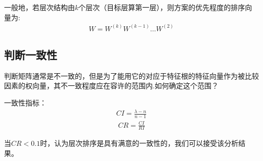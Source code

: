 \documentclass[letterpaper,10pt,english]{sphinxmanual}
\begin{document}
一般地，若层次结构由\(k\)个层次（目标层算第一层），则方案的优先程度的排序向量为:
\begin{equation*}
\begin{split}
W=W^{(k)} W^{(k-1)} \dots W^{(2)}
\end{split}
\end{equation*}

\subsection{判断一致性}
\label{\detokenize{docs/evaluation_model:id21}}
判断矩阵通常是不一致的，但是为了能用它的对应于特征根的特征向量作为被比较因素的权向量，其不一致程度应在容许的范围内.如何确定这个范围？

一致性指标：
\begin{equation*}
\begin{split}
C I=\frac{\lambda-n}{n-1}
\end{split}
\end{equation*}\begin{equation*}
\begin{split}
C R=\frac{C I}{R I}
\end{split}
\end{equation*}

当\(CR<0.1\)时，认为层次排序是具有满意的一致性的，我们可以接受该分析结果。
\end{document}
